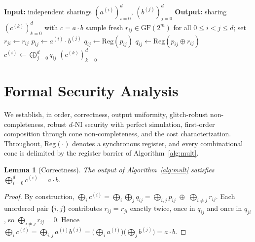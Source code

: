 \documentclass[lettersize,journal]{IEEEtran}
\newtheorem{lemma}{Lemma}
\newcommand{\GF}{\mathrm{GF}}
\newcommand{\share}[2]{#1^{(#2)}}
\begin{document}
\begin{algorithm}[t]
\caption{Proposed order-$d$ masked multiplier}
\label{alg:mult}
\begin{algorithmic}[1]
\STATE \textbf{Input:} independent sharings $(\share{a}{i})_{i=0}^{d}$, $(\share{b}{j})_{j=0}^{d}$
\STATE \textbf{Output:} sharing $(\share{c}{k})_{k=0}^{d}$ with $c = a \cdot b$
\STATE sample fresh $r_{ij}\in\GF(2^m)$ for all $0\le i<j\le d$; set $r_{ji}\leftarrow r_{ij}$
    \STATE $p_{ij} \leftarrow \share{a}{i} \cdot \share{b}{j}$ 
      \STATE $q_{ij} \leftarrow \mathrm{Reg}(p_{ij})$
    \ELSE
      \STATE $q_{ij} \leftarrow \mathrm{Reg}(p_{ij} \oplus r_{ij})$ 
    \ENDIF
  \ENDFOR
\ENDFOR
{}
  \STATE $\share{c}{i} \leftarrow \bigoplus_{j=0}^{d} q_{ij}$ 
\ENDFOR
\RETURN $(\share{c}{k})_{k=0}^{d}$
\end{algorithmic}
\end{algorithm}

\section{Formal Security Analysis}
\label{sec:security}
We establish, in order, correctness, output uniformity, glitch-robust
non-completeness, robust $d$-NI security with perfect simulation, first-order composition
through cone non-completeness, and the cost characterization. Throughout, $\mathrm{Reg}(\cdot)$ denotes
a synchronous register, and every combinational cone is delimited by the
register barrier of Algorithm~\ref{alg:mult}.

\begin{lemma}[Correctness]
\label{lem:correct}
The output of Algorithm~\ref{alg:mult} satisfies
$\bigoplus_{i=0}^{d}\share{c}{i}=a\cdot b$.
\end{lemma}
\begin{proof}
By construction,
$\bigoplus_i\share{c}{i}=\bigoplus_{i}\bigoplus_{j}q_{ij}
=\bigoplus_{i,j}p_{ij}\;\oplus\;\bigoplus_{i\neq j}r_{ij}$.
Each unordered pair $\{i,j\}$ contributes $r_{ij}=r_{ji}$ exactly twice, once in
$q_{ij}$ and once in $q_{ji}$, so $\bigoplus_{i\neq j}r_{ij}=0$. Hence
$\bigoplus_i\share{c}{i}=\bigoplus_{i,j}\share{a}{i}\share{b}{j}
=\big(\bigoplus_i\share{a}{i}\big)\big(\bigoplus_j\share{b}{j}\big)=a\cdot b$.
\end{proof}
\end{document}
